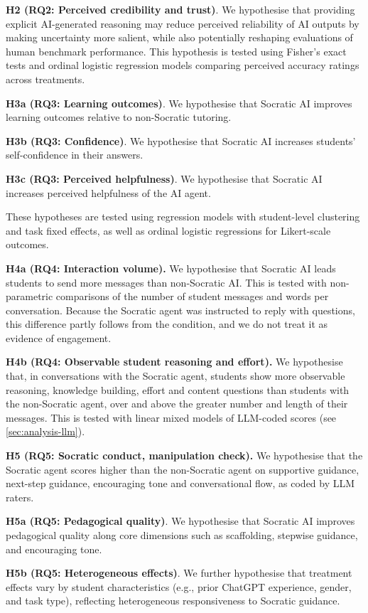 \documentclass[
  12pt,
]{article}
\begin{document}
\textbf{H2 (RQ2: Perceived credibility and trust)}.
We hypothesise that providing explicit AI-generated reasoning may reduce perceived reliability of AI outputs by making uncertainty more salient, while also potentially reshaping evaluations of human benchmark performance. This hypothesis is tested using Fisher's exact tests and ordinal logistic regression models comparing perceived accuracy ratings across treatments.

\textbf{H3a (RQ3: Learning outcomes)}.
We hypothesise that Socratic AI improves learning outcomes relative to non-Socratic tutoring.

\textbf{H3b (RQ3: Confidence)}.
We hypothesise that Socratic AI increases students' self-confidence in their answers.

\textbf{H3c (RQ3: Perceived helpfulness)}.
We hypothesise that Socratic AI increases perceived helpfulness of the AI agent.

These hypotheses are tested using regression models with student-level clustering and task fixed effects, as well as ordinal logistic regressions for Likert-scale outcomes.

\textbf{H4a (RQ4: Interaction volume).}
We hypothesise that Socratic AI leads students to send more messages than non-Socratic AI. This is tested with non-parametric comparisons of the number of student messages and words per conversation. Because the Socratic agent was instructed to reply with questions, this difference partly follows from the condition, and we do not treat it as evidence of engagement.

\textbf{H4b (RQ4: Observable student reasoning and effort).}
We hypothesise that, in conversations with the Socratic agent, students show more observable reasoning, knowledge building, effort and content questions than students with the non-Socratic agent, over and above the greater number and length of their messages. This is tested with linear mixed models of LLM-coded scores (see \ref{sec:analysis-llm}).

\textbf{H5 (RQ5: Socratic conduct, manipulation check).}
We hypothesise that the Socratic agent scores higher than the non-Socratic agent on supportive guidance, next-step guidance, encouraging tone and conversational flow, as coded by LLM raters.

\textbf{H5a (RQ5: Pedagogical quality)}.
We hypothesise that Socratic AI improves pedagogical quality along core dimensions such as scaffolding, stepwise guidance, and encouraging tone.

\textbf{H5b (RQ5: Heterogeneous effects)}. We further hypothesise that treatment effects vary by student characteristics (e.g., prior ChatGPT experience, gender, and task type), reflecting heterogeneous responsiveness to Socratic guidance.
\end{document}
